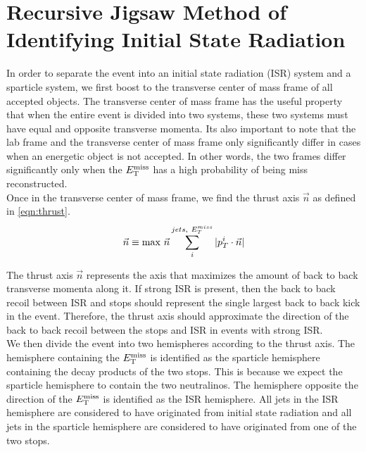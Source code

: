 \section{Recursive Jigsaw Method of Identifying Initial State Radiation}
\label{Jigsaw:ISR}

\indent In order to separate the event into an initial state radiation (ISR) system and a sparticle system, we first boost to the transverse center of mass frame of all accepted objects.  The transverse center of mass frame has the useful property that when the entire event is divided into two systems, these two systems must have equal and opposite transverse momenta.  Its also important to note that the lab frame and the transverse center of mass frame only significantly differ in cases when an energetic object is not accepted.  In other words, the two frames differ significantly only when the $E_{\mathrm{T}}^{\mathrm{miss}}$ has a high probability of being miss reconstructed. \\

\indent Once in the transverse center of mass frame, we find the thrust axis $\vec{n}$ as defined in \ref{eqn:thrust}.  \\

\begin{equation}
\label{eqn:thrust}
\vec{n} \equiv \max_{}\,{\vec{n}} \sum_i^{jets,~E^{miss}_T} |p_T^i \cdot \vec{n}|
\end{equation}

\indent The thrust axis $\vec{n}$ represents the axis that maximizes the amount of back to back transverse momenta along it.  If strong ISR is present, then the back to back recoil between ISR and stops should represent the single largest back to back kick in the event.  Therefore, the thrust axis should approximate the direction of the back to back recoil between the stops and ISR in events with strong ISR. \\

\indent  We then divide the event into two hemispheres according to the thrust axis.  The hemisphere containing the $E_{\mathrm{T}}^{\mathrm{miss}}$ is identified as the sparticle hemisphere containing the decay products of the two stops.  This is because we expect the sparticle hemisphere to contain the two neutralinos.  The hemisphere opposite the direction of the $E_{\mathrm{T}}^{\mathrm{miss}}$ is identified as the ISR hemisphere.  All jets in the ISR hemisphere are considered to have originated from initial state radiation and all jets in the sparticle hemisphere are considered to have originated from one of the two stops. \\

